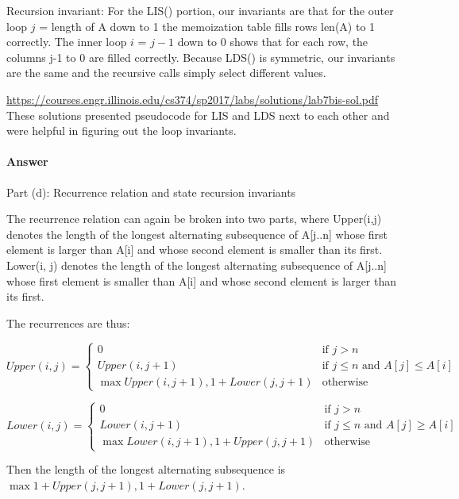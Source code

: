 \documentclass{article}
\begin{document}
Recursion invariant: For the LIS() portion, our invariants are that for the outer loop $j$ = length of A down to 1 the memoization table fills rows len(A) to 1 correctly. The inner loop $i$ = $j -1$ down to 0 shows that for each row, the columns j-1 to 0 are filled correctly. Because LDS() is symmetric, our invariants are the same and the recursive calls simply select different values. 

\url{https://courses.engr.illinois.edu/cs374/sp2017/labs/solutions/lab7bis-sol.pdf} These solutions presented pseudocode for LIS and LDS next to each other and were helpful in figuring out the loop invariants. 

\paragraph{Answer}{Part (d): Recurrence relation and state recursion invariants}

The recurrence relation can again be broken into two parts, where Upper(i,j) denotes the length of the longest alternating subsequence of A[j..n] whose first element is larger than A[i] and whose second element is smaller than its first. Lower(i, j) denotes the length of the longest alternating subsequence of A[j..n] whose first element is smaller than A[i] and whose second element is larger than its first. 

The recurrences are thus: 

\begin{equation}
Upper(i,j) = 
\begin{cases}
0 & \text{if $j > n$}\\
Upper(i, j+1) & \text{if $j \leq n$ and $A[j] \leq A[i]$}\\
\max{Upper(i, j+1), 1 + Lower(j, j+1)} & \text{otherwise}
\end{cases}
\end{equation}

\begin{equation}
Lower(i,j) = 
\begin{cases}
0 & \text{if $j > n$}\\
Lower(i, j+1) & \text{if $j \leq n$ and $A[j] \geq A[i]$}\\
\max{Lower(i, j+1), 1 + Upper(j, j+1)} & \text{otherwise}
\end{cases}
\end{equation}

Then the length of the longest alternating subsequence is $\max{1 + Upper(j, j+1), 1 + Lower(j, j+1)}$.
\end{document}
